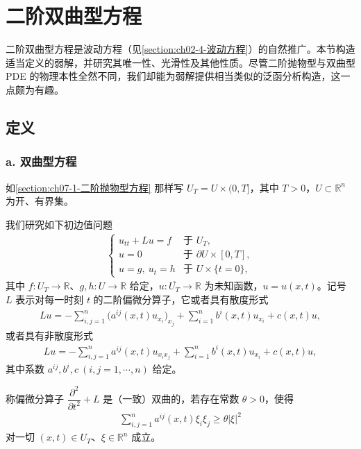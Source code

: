 \documentclass[../../main.tex]{subfiles}
\begin{document}
\section{二阶双曲型方程}\label{section:ch07-2-二阶双曲型方程}

二阶双曲型方程是波动方程（见\cref{section:ch02-4-波动方程}）的自然推广。本节构造适当定义的弱解，并研究其唯一性、光滑性及其他性质。尽管二阶抛物型与双曲型 PDE 的物理本性全然不同，我们却能为弱解提供相当类似的泛函分析构造，这一点颇为有趣。

\subsection{定义}\label{subsection:ch07-2-1-定义}

\subsubsection*{a. 双曲型方程}

如\cref{section:ch07-1-二阶抛物型方程} 那样写 $U_T=U\times(0,T]$，其中 $T>0$，$U\subset\mathbb{R}^n$ 为开、有界集。

我们研究如下初边值问题
\begin{align}
\begin{cases}
u_{tt}+Lu=f & \text{于 } U_T,\\
u=0 & \text{于 } \partial U\times[0,T],\\
u=g,\ u_t=h & \text{于 } U\times\{t=0\},
\end{cases}\label{align:ch07-2-eq01}
\end{align}
其中 $f:U_T\to\mathbb{R}$、$g,h:U\to\mathbb{R}$ 给定，$u:\overline{U_T}\to\mathbb{R}$ 为未知函数，$u=u(x,t)$。记号 $L$ 表示对每一时刻 $t$ 的二阶偏微分算子，它或者具有散度形式
\begin{align}
Lu = -\sum_{i,j=1}^n \bigl(a^{ij}(x,t)u_{x_i}\bigr)_{x_j} + \sum_{i=1}^n b^i(x,t)u_{x_i} + c(x,t)u,\label{align:ch07-2-eq02}
\end{align}
或者具有非散度形式
\begin{align}
Lu = -\sum_{i,j=1}^n a^{ij}(x,t)u_{x_ix_j} + \sum_{i=1}^n b^i(x,t)u_{x_i} + c(x,t)u,\label{align:ch07-2-eq03}
\end{align}
其中系数 $a^{ij},b^i,c\ (i,j=1,\cdots,n)$ 给定。

\begin{definition}\label{definition:ch07-2-双曲算子}
称偏微分算子 $\dfrac{\partial^2}{\partial t^2}+L$ 是（一致）双曲的，若存在常数 $\theta>0$，使得
\begin{align}
\sum_{i,j=1}^n a^{ij}(x,t)\xi_i\xi_j \geqslant \theta|\xi|^2\label{align:ch07-2-eq04}
\end{align}
对一切 $(x,t)\in U_T$、$\xi\in\mathbb{R}^n$ 成立。
\end{definition}
\end{document}
